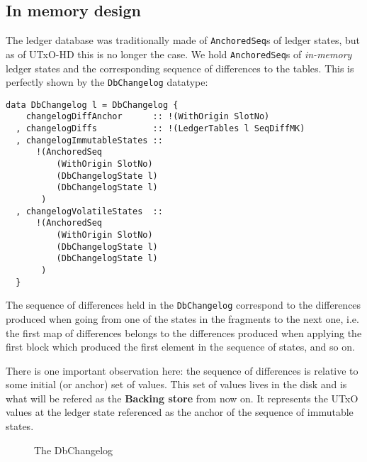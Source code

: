 \documentclass[11pt,a4paper]{article}
\theoremstyle{definition}
\begin{document}
\subsection{In memory design}

The ledger database was traditionally made of \texttt{AnchoredSeq}s of ledger
states, but as of UTxO-HD this is no longer the case. We hold
\texttt{AnchoredSeq}s of \emph{in-memory} ledger states and the corresponding
sequence of differences to the tables. This is perfectly shown by the
\texttt{DbChangelog} datatype:

\begin{lstlisting}
data DbChangelog l = DbChangelog {
    changelogDiffAnchor      :: !(WithOrigin SlotNo)
  , changelogDiffs           :: !(LedgerTables l SeqDiffMK)
  , changelogImmutableStates ::
      !(AnchoredSeq
          (WithOrigin SlotNo)
          (DbChangelogState l)
          (DbChangelogState l)
       )
  , changelogVolatileStates  ::
      !(AnchoredSeq
          (WithOrigin SlotNo)
          (DbChangelogState l)
          (DbChangelogState l)
       )
  }
\end{lstlisting}

The sequence of differences held in the \texttt{DbChangelog} correspond to the
differences produced when going from one of the states in the fragments to the
next one, i.e. the first map of differences belongs to the differences produced
when applying the first block which produced the first element in the sequence
of states, and so on.

There is one important observation here: the sequence of differences is relative
to some initial (or anchor) set of values. This set of values lives in the disk
and is what will be refered as the \textbf{Backing store} from now on. It
represents the UTxO values at the ledger state referenced as the anchor of the
sequence of immutable states.

\begin{figure}[h]
  \centering
  \caption{The DbChangelog} \label{fig:dbch}
\end{figure}
\end{document}
